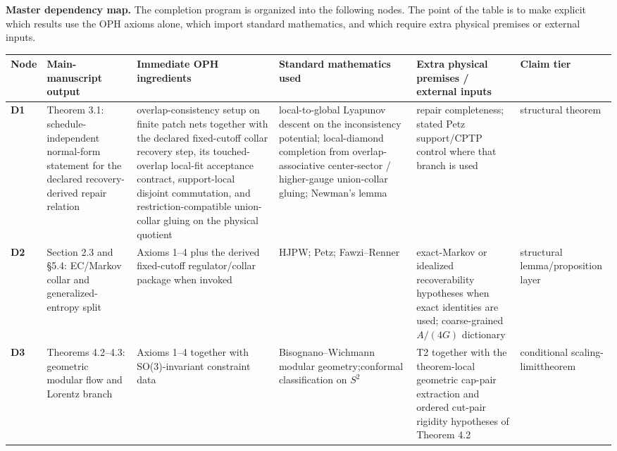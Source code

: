 \textbf{Master dependency map.} The completion program is organized into the following nodes. The point of the table is to make explicit which results use the OPH axioms alone, which import standard mathematics, and which require extra physical premises or external inputs.

\begingroup
\scriptsize
{\def\LTcaptype{none}
\setlength{\tabcolsep}{1pt}
\begin{longtable}[]{@{}>{\RaggedRight\arraybackslash}p{}>{\RaggedRight\arraybackslash}p{}>{\RaggedRight\arraybackslash}p{}>{\RaggedRight\arraybackslash}p{}>{\RaggedRight\arraybackslash}p{}>{\RaggedRight\arraybackslash}p{}@{}}
\toprule\noalign{}
Node & Main-manuscript output & Immediate OPH ingredients & Standard mathematics used & Extra physical premises / external inputs & Claim tier \\
\midrule\noalign{}
\endhead
\bottomrule\noalign{}
\endlastfoot
\textbf{D1} & Theorem 3.1: schedule-independent normal-form statement for the declared recovery-derived repair relation & overlap-consistency setup on finite patch nets together with the declared fixed-cutoff collar recovery step, its touched-overlap local-fit acceptance contract, support-local disjoint commutation, and restriction-compatible union-collar gluing on the physical quotient & local-to-global Lyapunov descent on the inconsistency potential; local-diamond completion from overlap-associative center-sector / higher-gauge union-collar gluing; Newman's lemma & repair completeness; stated Petz support/CPTP control where that branch is used & structural theorem \\
\textbf{D2} & Section 2.3 and \S5.4: EC/Markov collar and generalized-entropy split & Axioms 1--4 plus the derived fixed-cutoff regulator/collar package when invoked & HJPW; Petz; Fawzi--Renner & exact-Markov or idealized recoverability hypotheses when exact identities are used; coarse-grained \(A/(4G)\) dictionary & structural lemma/\newline proposition layer \\
\textbf{D3} & Theorems 4.2--4.3: geometric modular flow and Lorentz branch & Axioms 1--4 together with SO(3)-invariant constraint data & Bisognano--Wichmann modular geometry;\newline conformal classification on \(S^2\) & T2 together with the theorem-local geometric cap-pair extraction and ordered cut-pair rigidity hypotheses of Theorem 4.2 & conditional scaling-limit\newline theorem \\

\end{longtable}}
